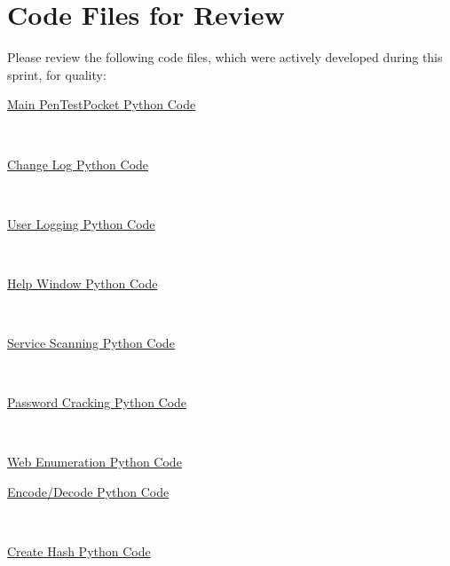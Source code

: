 \documentclass{article}
\begin{document}
\section{Code Files for Review}
Please review the following code files, which were actively developed during this
sprint, for quality:
\begin{center}
\href{https://github.com/zachA214/Adelson\_Senior\_Capstone/blob/main/PenTestPocket/pentestpocket.py}{Main PenTestPocket Python Code} 
\end{center}
\\
\begin{center}
\href{https://github.com/zachA214/Adelson_Senior_Capstone/blob/main/PenTestPocket/changelog.py}{Change Log Python Code}
\end{center}
\\
\begin{center}
\href{https://github.com/zachA214/Adelson_Senior_Capstone/blob/main/PenTestPocket/userlogging.py}{User Logging Python Code}   
\end{center}
\\
\begin{center}
\href{https://github.com/zachA214/Adelson_Senior_Capstone/blob/main/PenTestPocket/helpwindow.py}{Help Window Python Code}   
\end{center}
\\
\begin{center}
\href{https://github.com/zachA214/Adelson_Senior_Capstone/blob/main/PenTestPocket/servicescanning.py}{Service Scanning Python Code}   
\end{center}
\\
\begin{center}
\href{https://github.com/zachA214/Adelson_Senior_Capstone/blob/main/PenTestPocket/passwordcracking.py}{Password Cracking Python Code}   
\end{center}
\\
\begin{center}
\href{https://github.com/zachA214/Adelson_Senior_Capstone/blob/main/PenTestPocket/webenumeration.py}{Web Enumeration Python Code}   
\end{center}

\begin{center}
\href{https://github.com/zachA214/Adelson_Senior_Capstone/blob/main/PenTestPocket/encodedecode.py}{Encode/Decode Python Code}   
\end{center}
\\
\begin{center}
\href{\\https://github.com/zachA214/Adelson_Senior_Capstone/blob/main/PenTestPocket/createhash.py}{Create Hash Python Code}   
\end{center}
\end{document}
